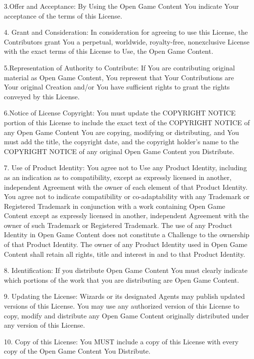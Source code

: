 \documentclass[a4paper,11pt,twoside,openany]{book}
\begin{document}
{{3.Offer and Acceptance: By Using the Open Game Content You indicate Your acceptance of the terms of this License.

4. Grant and Consideration: In consideration for agreeing to use this License, the Contributors grant You a perpetual, worldwide, royalty-free, nonexclusive License with the exact terms of this License to Use, the Open Game Content.

5.Representation of Authority to Contribute: If You are contributing original material as Open Game Content, You represent that Your Contributions are Your original Creation and/or You have sufficient rights to grant the rights conveyed by this License.

6.Notice of License Copyright: You must update the COPYRIGHT NOTICE portion of this License to include the exact text of the COPYRIGHT NOTICE of any Open Game Content You are copying, modifying or distributing, and You must add the title, the copyright date, and the copyright holder's name to the COPYRIGHT NOTICE of any original Open Game Content you Distribute.

7. Use of Product Identity: You agree not to Use any Product Identity, including as an indication as to compatibility, except as expressly licensed in another, independent Agreement with the owner of each element of that Product Identity. You agree not to indicate compatibility or co-adaptability with any Trademark or Registered Trademark in conjunction with a work containing Open Game Content except as expressly licensed in another, independent Agreement with the owner of such Trademark or Registered Trademark. The use of any Product Identity in Open Game Content does not constitute a Challenge to the ownership of that Product Identity. The owner of any Product Identity used in Open Game Content shall retain all rights, title and interest in and to that Product Identity.

8. Identification: If you distribute Open Game Content You must clearly indicate which portions of the work that you are distributing are Open Game Content.

9. Updating the License: Wizards or its designated Agents may publish updated versions of this License. You may use any authorized version of this License to copy, modify and distribute any Open Game Content originally distributed under any version of this License.

10. Copy of this License: You MUST include a copy of this License with every copy of the Open Game Content You Distribute.

}}
\end{document}
